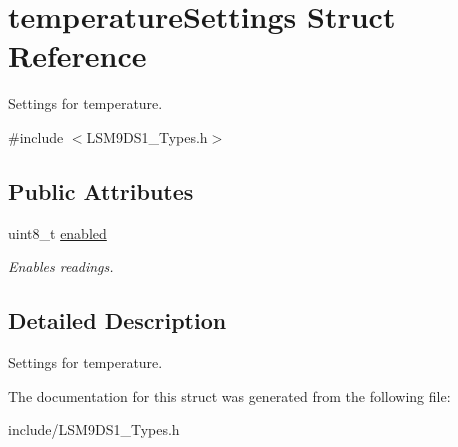 \hypertarget{structtemperatureSettings}{}\section{temperature\+Settings Struct Reference}
\label{structtemperatureSettings}


Settings for temperature.  




{\ttfamily \#include $<$L\+S\+M9\+D\+S1\+\_\+\+Types.\+h$>$}

\subsection*{Public Attributes}
\begin{DoxyCompactItemize}
\item 
\mbox{\label{structtemperatureSettings_aeb258e2620d85e2f72fc057dbffa9715}} 
uint8\+\_\+t \hyperlink{structtemperatureSettings_aeb258e2620d85e2f72fc057dbffa9715}{enabled}
\begin{DoxyCompactList}\small\item\em Enables readings. \end{DoxyCompactList}\end{DoxyCompactItemize}


\subsection{Detailed Description}
Settings for temperature. 

The documentation for this struct was generated from the following file\+:\begin{DoxyCompactItemize}
\item 
include/L\+S\+M9\+D\+S1\+\_\+\+Types.\+h\end{DoxyCompactItemize}
